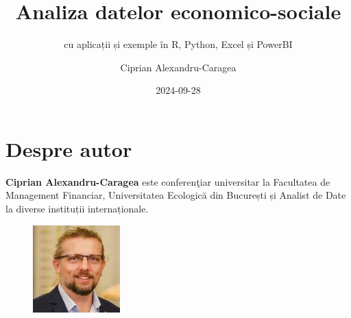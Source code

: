 \documentclass[
  11pt,
  b5paper,
  nottoc]{book}
\title{Analiza datelor economico-sociale}
\subtitle{cu aplicații și exemple în R, Python, Excel și PowerBI}
\author{Ciprian Alexandru-Caragea}
\date{2024-09-28}
\renewcommand{\contentsname}{Cuprins}
\renewcommand*\contentsname{Table of contents}
\newcommand\contentsname{Table of contents}
\begin{document}
\frontmatter
\maketitle
\ifdefined\Shaded\renewenvironment{Shaded}{\begin{tcolorbox}[interior hidden, boxrule=0pt, borderline west={3pt}{0pt}{shadecolor}, sharp corners, enhanced, frame hidden, breakable]}{\end{tcolorbox}}\fi

\renewcommand*\contentsname{Cuprins}
{
\setcounter{tocdepth}{1}
\tableofcontents
}
\listoffigures
\listoftables
\mainmatter
{}

\hypertarget{despre-autor}{%
\chapter*{Despre autor}\label{despre-autor}}


\setcounter{page}{3}

\textbf{Ciprian Alexandru-Caragea} este conferenţiar universitar la
Facultatea de Management Financiar, Universitatea Ecologică din
București și Analist de Date la diverse instituții internaționale.\\

\begin{figure}
  \begin{center}
    \includegraphics[width=0.3\textwidth]{images/Ciprian_DGINS2018.jpg}
  \end{center}
\end{figure}
\end{document}
